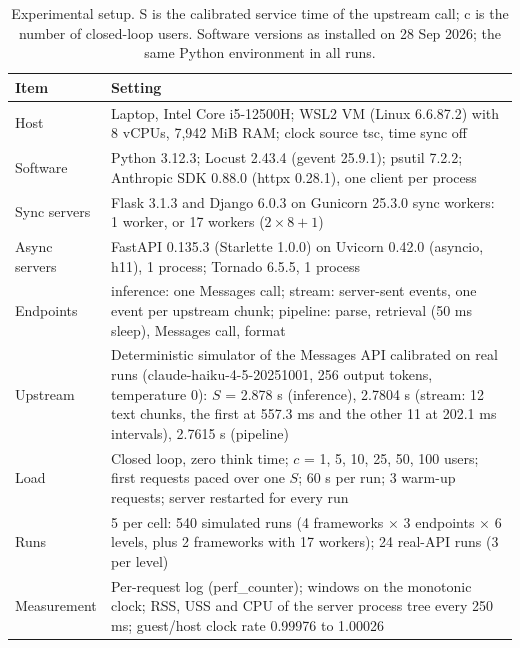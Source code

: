 \begin{table}[tbp]
  \caption{Experimental setup. S is the calibrated service time of the upstream call; c is the number of
  closed-loop users. Software versions as installed on 28 Sep 2026; the same Python environment in all runs.}
  \label{tab:setup}
  \footnotesize
  \begin{tabular}{@{}p{}p{}@{}}
    \toprule
    Item & Setting \\
    \midrule
    Host & Laptop, Intel Core i5-12500H; WSL2 VM (Linux 6.6.87.2) with 8 vCPUs, 7,942 MiB RAM; clock source tsc, time sync off \\
    Software & Python 3.12.3; Locust 2.43.4 (gevent 25.9.1); psutil 7.2.2; Anthropic SDK 0.88.0 (httpx 0.28.1), one client per process \\
    Sync servers & Flask 3.1.3 and Django 6.0.3 on Gunicorn 25.3.0 sync workers: 1 worker, or 17 workers ($2 \times 8 + 1$) \\
    Async servers & FastAPI 0.135.3 (Starlette 1.0.0) on Uvicorn 0.42.0 (asyncio, h11), 1 process; Tornado 6.5.5, 1 process \\
    Endpoints & inference: one Messages call; stream: server-sent events, one event per upstream chunk; pipeline: parse, retrieval (50 ms sleep), Messages call, format \\
    Upstream & Deterministic simulator of the Messages API calibrated on real runs (claude-haiku-4-5-20251001, 256 output tokens, temperature 0): $S$ = 2.878 s (inference), 2.7804 s (stream: 12 text chunks, the first at 557.3 ms and the other 11 at 202.1 ms intervals), 2.7615 s (pipeline) \\
    Load & Closed loop, zero think time; $c$ = 1, 5, 10, 25, 50, 100 users; first requests paced over one $S$; 60 s per run; 3 warm-up requests; server restarted for every run \\
    Runs & 5 per cell: 540 simulated runs (4 frameworks $\times$ 3 endpoints $\times$ 6 levels, plus 2 frameworks with 17 workers); 24 real-API runs (3 per level) \\
    Measurement & Per-request log (perf\_counter); windows on the monotonic clock; RSS, USS and CPU of the server process tree every 250 ms; guest/host clock rate 0.99976 to 1.00026 \\
    \bottomrule
  \end{tabular}
\end{table}
